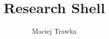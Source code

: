 \newcommand {\ShellName}	{Research Shell}

\title	{\ShellName}
\author	{Maciej Trawka}

\newcommand {\aio}	{research\_shell}
\newcommand {\daio}	{research\_shell\_drun}

\newcommand {\Lfsr}			{\texttt{Lfsr}}
\newcommand {\PhaseShifter}	{\texttt{PhaseShifter}}
\newcommand {\Polynomial}	{\texttt{Polynomial}}
